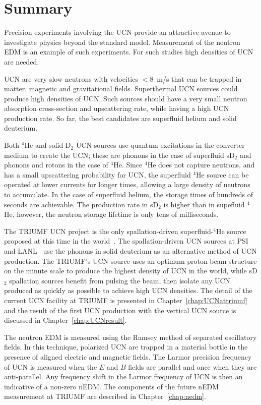 \section{Summary}
Precision experiments involving the UCN provide an attractive avenue
to investigate physics beyond the standard model. Measurement of the
neutron EDM is an example of such experiments. For such studies high
densities of UCN are needed.

UCN are very slow neutrons with velocities $<8$~m/s that can be
trapped in matter, magnetic and gravitational fields.  Superthermal
UCN sources could produce high densities of UCN. Such sources should
have a very small neutron absorption cross-section and upscattering
rate, while having a high UCN production rate. So far, the best
candidates are superfluid helium and solid deuterium.

Both $^4$He and solid D$_2$ UCN sources use quantum excitations in the
converter medium to create the UCN; these are phonons in the case of
superfluid sD$_2$ and phonons and rotons in the case of $^4$He. Since
$^4$He does not capture neutrons, and has a small upscattering
probability for UCN, the superfluid $^4$He source can be operated at
lower currents for longer times, allowing a large density of neutrons
to accumulate. In the case of superfluid helium, the storage times of
hundreds of seconds are achievable. The production rate in sD$_2$ is
higher than in supefluid $^4$He, however, the neutron storage lifetime is
only tens of milliseconds.

The TRIUMF UCN project is the only spallation-driven superfluid-$^4$He
source proposed at this time in the world~\cite{Ruediger}. The
spallation-driven UCN sources at PSI~\cite{Ries_ascona} and
LANL~\cite{Ito_ascona} use the phonons in solid deuterium as an
alternative method of UCN production.
The TRIUMF's UCN source uses an optimum proton beam structure on the
minute scale to produce the highest density of UCN in the world, while
sD$_2$ spallation sources benefit from pulsing the beam, then isolate
any UCN produced as quickly as possible to achieve high UCN densities.
The detail of the current UCN facility at TRIUMF is presented in
Chapter~\ref{chap:UCNattriumf} and the result of the first UCN
production with the vertical UCN source is discussed in
Chapter~\ref{chap:UCNresult}.

The neutron EDM is measured using the Ramsey method of separated
oscillatory fields. In this technique, polarized UCN are trapped in a
material bottle in the presence of aligned electric and magnetic
fields. The Larmor precision frequency of UCN is measured when the $E$
and $B$ fields are parallel and once when they are anti-parallel. Any
frequency shift in the Larmor frequency of UCN is then an indicative
of a non-zero nEDM. The components of the future nEDM measurement at
TRIUMF are described in Chapter~\ref{chap:nedm}.
